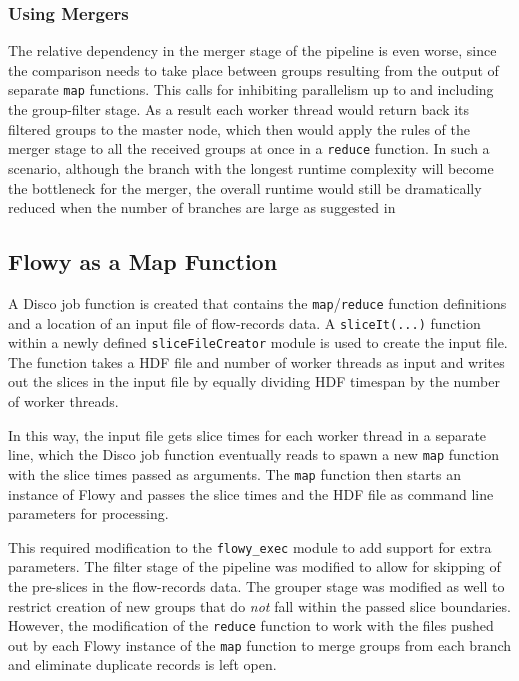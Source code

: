 \subsubsection{Using Mergers}\label{subsec:using-mergers}
The relative dependency in the merger stage of the pipeline is even worse, since the comparison needs to take place between groups resulting from the output of separate \texttt{map} functions. This calls for inhibiting parallelism up to and including the group-filter stage. As a result each worker thread would return back its filtered groups to the master node, which then would apply the rules of the merger stage to all the received groups at once in a \texttt{reduce} function. In such a scenario, although the branch with the longest runtime complexity will become the bottleneck for the merger, the overall runtime would still be dramatically reduced when the number of branches are large as suggested in \cite{jschauer:2012}

\subsection{Flowy as a Map Function}\label{subsec:flowy-map}
A Disco job function is created that contains the \texttt{map}/\texttt{reduce} function definitions and a location of an input file of flow-records data. A \texttt{sliceIt(...)} function within a newly defined \texttt{sliceFileCreator} module is used to create the input file. The function takes a \ac{HDF} file and number of worker threads as input and writes out the slices in the input file by equally dividing \ac{HDF} timespan by the number of worker threads. 

In this way, the input file gets slice times for each worker thread in a separate line, which the Disco job function eventually reads to spawn a new \texttt{map} function with the slice times passed as arguments. The \texttt{map} function then starts an instance of Flowy and passes the slice times and the \ac{HDF} file as command line parameters for processing. 

This required modification to the \texttt{flowy\_exec} module to add support for extra parameters. The filter stage of the pipeline was modified to allow for skipping of the pre-slices in the flow-records data. The grouper stage was modified as well to restrict creation of new groups that do \emph{not} fall within the passed slice boundaries. However, the modification of the \texttt{reduce} function to work with the files pushed out by each Flowy instance of the \texttt{map} function to merge groups from each branch and eliminate duplicate records is left open. 